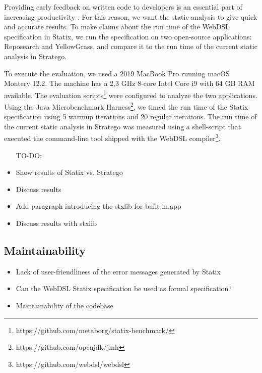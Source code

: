     Providing early feedback on written code to developers is an essential part of increasing productivity \autocite{Becker2019}. For this reason, we want the static analysis to give quick and accurate results. To make claims about the run time of the WebDSL specification in Statix, we run the specification on two open-source applications: Reposearch and YellowGrass, and compare it to the run time of the current static analysis in Stratego.

    To execute the evaluation, we used a 2019 MacBook Pro running macOS Montery 12.2. The machine has a 2,3 GHz 8-core Intel Core i9 with 64 GB RAM available. The evaluation scripts\footnote{https://github.com/metaborg/statix-benchmark/} were configured to analyze the two applications. Using the Java Microbenchmark Harness\footnote{https://github.com/openjdk/jmh}, we timed the run time of the Statix specification using 5 warmup iterations and 20 regular iterations. The run time of the current static analysis in Stratego was measured using a shell-script that executed the command-line tool shipped with the WebDSL compiler\footnote{https://github.com/webdsl/webdsl}.

    \begin{itemize}
      \item[TO-DO:]
      \item Show results of Statix vs. Stratego
      \item Discuss results
      \item Add paragraph introducing the stxlib for built-in.app
      \item Discuss results with stxlib
    \end{itemize}

  \subsection{Maintainability}

    \begin{itemize}
      \item Lack of user-friendliness of the error messages generated by Statix
      \item Can the WebDSL Statix specification be used as formal specification?
      \item Maintainability of the codebase
    \end{itemize}

